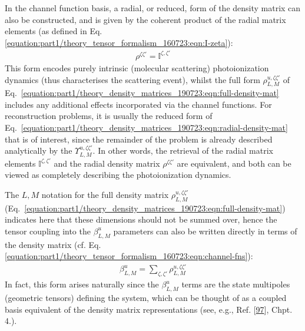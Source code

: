 \documentclass[letterpaper,table,10pt,english]{jupyterBook}
\begin{document}
\sphinxAtStartPar
In the channel function basis, a radial, or reduced, form of the density matrix can also be constructed, and is given by the coherent product of the radial matrix elements (as defined in Eq. \eqref{equation:part1/theory_tensor_formalism_160723:eqn:I-zeta}):
\begin{equation}\label{equation:part1/theory_density_matrices_190723:eqn:radial-density-mat}
\begin{split}
\rho^{\zeta\zeta'} = \mathbb{I}^{\zeta,\zeta'}
\end{split}
\end{equation}
\sphinxAtStartPar
This form encodes purely intrinsic (molecular scattering) photoionization dynamics (thus characterises the scattering event), whilst the full form \({\rho}_{L,M}^{u,\zeta\zeta'}\) of Eq. \eqref{equation:part1/theory_density_matrices_190723:eqn:full-density-mat} includes any additional effects incorporated via the channel functions. For reconstruction problems, it is usually the reduced form of Eq. \eqref{equation:part1/theory_density_matrices_190723:eqn:radial-density-mat} that is of interest, since the remainder of the problem is already described analytically by the {\hyperref[\detokenize{backmatter/glossary:term-channel-functions}]{}} \(\varUpsilon_{L,M}^{u,\zeta\zeta'}\). In other words, the retrieval of the radial matrix elements \(\mathbb{I}^{\zeta,\zeta'}\) and the radial density matrix \(\rho^{\zeta\zeta'}\) are equivalent, and both can be viewed as completely describing the photoionization dynamics.

\sphinxAtStartPar
The \(L,M\) notation for the full density matrix \({\rho}_{L,M}^{u,\zeta\zeta'}\) (Eq. \eqref{equation:part1/theory_density_matrices_190723:eqn:full-density-mat}) indicates here that these dimensions should not be summed over, hence the tensor coupling into the \(\beta_{L,M}^{u}\) parameters can also be written directly in terms of the density matrix (cf. Eq. \eqref{equation:part1/theory_tensor_formalism_160723:eqn:channel-fns}):
\begin{equation}\label{equation:part1/theory_density_matrices_190723:eqn:beta-density-mat}
\begin{split}
\beta_{L,M}^{u}=\sum_{\zeta,\zeta'}{\rho}_{L,M}^{u,\zeta\zeta'}
\end{split}
\end{equation}
\sphinxAtStartPar
In fact, this form arises naturally since the \(\beta_{L,M}^{u}\) terms are the state multipoles (geometric tensors) defining the system, which can be thought of as a coupled basis equivalent of the density matrix representations (see, e.g., Ref. {[}\hyperlink{cite.backmatter/bibliography:id535}{97}{]}, Chpt. 4.).
\end{document}
